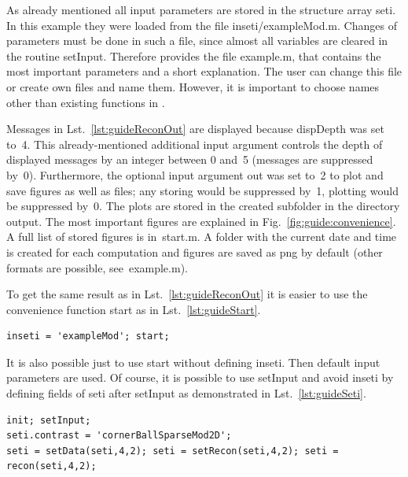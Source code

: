\documentclass[a4paper]{article}
\begin{document}
As already mentioned all input parameters are stored in the structure array \textsf{seti}. In this example they were loaded from the file \textsf{inseti/exampleMod.m}. Changes of parameters must be done in such a file, since almost all variables are cleared in the routine \textsf{setInput}. Therefore \IPscatt provides the file \textsf{example.m}, that contains the most important parameters and a short explanation. The user can change this file or create own files and name them. However, it is important to choose names other than existing functions in \IPscatt. 

Messages in Lst.~\ref{lst:guideReconOut} are displayed because \textsf{dispDepth} was set to~4. This already-mentioned additional input argument controls the depth of displayed messages by an integer between 0 and~5 (messages are suppressed by~0). Furthermore, the optional input argument \textsf{out} was set to~2 to plot and save figures as well as files; any storing would be suppressed by~1, plotting would be suppressed by~0. The plots are stored in the created subfolder in the directory \textsf{output}. 
The most important figures are explained in Fig.~\ref{fig:guide:convenience}. A full list of stored figures is in~\textsf{start.m}. 
A folder with the current date and time is created for each computation and figures are saved as \textsf{png} by default (other formats are possible, see~\textsf{example.m}).

To get the same result as in Lst.~\ref{lst:guideReconOut} it is easier to use the convenience function \textsf{start} as in Lst.~\ref{lst:guideStart}.

\begin{lstlisting}[caption={Convenience function \textsf{start}.},label=lst:guideStart]
inseti = 'exampleMod'; start;
\end{lstlisting}

It is also possible just to use \textsf{start} without defining \textsf{inseti}. Then default input parameters are used. 
%
Of course, it is possible to use \textsf{setInput} and avoid \textsf{inseti} by defining fields of \textsf{seti} after \textsf{setInput} as demonstrated in Lst.~\ref{lst:guideSeti}.

\begin{lstlisting}[caption={Control the running of all processes (\emph{source code}: \textsf{guides/guideSeti.m}).},label=lst:guideSeti]
init; setInput;
seti.contrast = 'cornerBallSparseMod2D';
seti = setData(seti,4,2); seti = setRecon(seti,4,2); seti = recon(seti,4,2);
\end{lstlisting}
\end{document}

